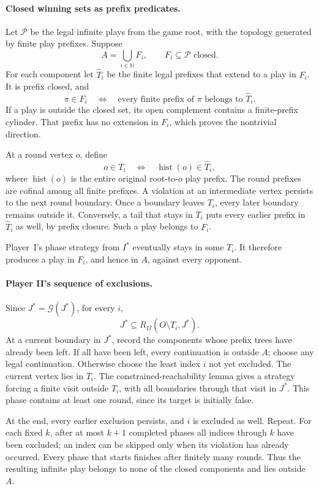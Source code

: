 \paragraph{Closed winning sets as prefix predicates.}
Let \(\mathcal P\) be
the legal infinite plays
from the game root,
with the topology
generated by finite
play prefixes.
Suppose
\[
 A=\bigcup_{i\in\mathbb N}F_i,
 \qquad F_i\subseteq\mathcal P\text{ closed}.
\]
For each component let
\(\widehat T_i\) be
the finite legal prefixes
that extend to a
play in \(F_i\).
It is prefix closed,
and
\[
 \pi\in F_i
 \quad\Longleftrightarrow\quad
 \text{every finite prefix of }\pi
                         \text{ belongs to }\widehat T_i.
\]
If a play is outside
the closed set, its
open complement contains
a finite-prefix cylinder.
That prefix has no
extension in \(F_i\),
which proves the
nontrivial direction.

At a round vertex
\(o\), define
\[
 o\in T_i
 \quad\Longleftrightarrow\quad
 \operatorname{hist}(o)\in\widehat T_i,
\]
where \(\operatorname{hist}(o)\)
is the entire original
root-to-\(o\) play prefix.
The round prefixes are
cofinal among all finite
prefixes. A violation
at an intermediate vertex
persists to the next
round boundary.
Once a boundary leaves
\(T_i\), every later
boundary remains outside
it.
Conversely, a tail that
stays in \(T_i\)
puts every earlier
prefix in \(\widehat T_i\)
as well, by prefix
closure.
Such a play belongs
to \(F_i\).

Player~I's phase strategy
from \(I^*\) eventually
stays in some \(T_i\).
It therefore produces
a play in \(F_i\),
and hence in \(A\),
against every opponent.

\paragraph{Player II's sequence of exclusions.}
Since \(J^*=\mathcal G(J^*)\),
for every \(i\),
\[
 J^*\subseteq R_{II}(O\setminus T_i,J^*).
\]
At a current boundary
in \(J^*\), record
the components whose
prefix trees have already
been left.
If all have been
left, every continuation
is outside \(A\);
choose any legal
continuation.
Otherwise choose the
least index \(i\)
not yet excluded.
The current vertex
lies in \(T_i\).
The constrained-reachability
lemma gives a strategy
forcing a finite visit
outside \(T_i\), with
all boundaries through
that visit in \(J^*\).
This phase contains
at least one round,
since its target is
initially false.

At the end, every
earlier exclusion persists,
and \(i\) is excluded
as well. Repeat.
For each fixed \(k\),
after at most \(k+1\)
completed phases all
indices through \(k\)
have been excluded;
an index can be
skipped only when its
violation has already
occurred.
Every phase that starts
finishes after finitely
many rounds.
Thus the resulting
infinite play belongs
to none of the
closed components and
lies outside \(A\).

